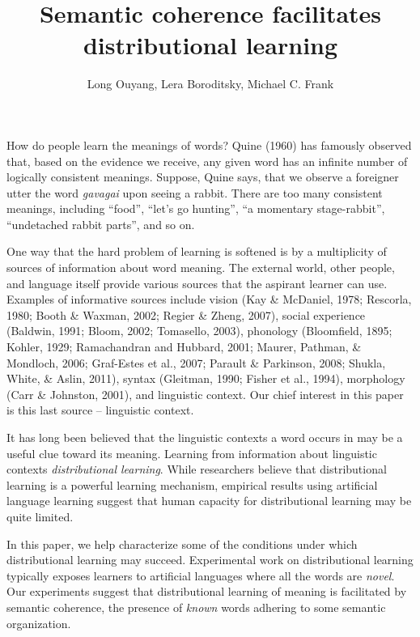 \documentclass[man,floatsintext]{apa6}
\title{Semantic coherence facilitates distributional learning}
\author{Long Ouyang, Lera Boroditsky, Michael C. Frank}
\affiliation{Stanford University}
\begin{document}
\maketitle

How do people learn the meanings of words? Quine (1960) has famously observed that, based on the evidence we receive, any given word has an infinite number of logically consistent meanings. Suppose, Quine says, that we observe a foreigner utter the word \emph{gavagai} upon seeing a rabbit. There are too many consistent meanings, including ``food'', ``let's go hunting'', ``a momentary stage-rabbit'', ``undetached rabbit parts'', and so on.

One way that the hard problem of learning is softened is by a multiplicity of sources of information about word meaning. The external world, other people, and language itself provide various sources that the aspirant learner can use. Examples of informative sources include vision (Kay \& McDaniel, 1978; Rescorla, 1980; Booth \& Waxman, 2002; Regier \& Zheng, 2007), social experience (Baldwin, 1991; Bloom, 2002; Tomasello, 2003), phonology (Bloomfield, 1895; Kohler, 1929; Ramachandran and Hubbard, 2001; Maurer, Pathman, \& Mondloch, 2006; Graf-Estes et al., 2007; Parault \& Parkinson, 2008; Shukla, White, \& Aslin, 2011), syntax (Gleitman, 1990; Fisher et al., 1994), morphology (Carr \& Johnston, 2001), and linguistic context. Our chief interest in this paper is this last source -- linguistic context.

 It has long been believed that the linguistic contexts a word occurs in may be a useful clue toward its meaning. Learning from information about linguistic contexts \emph{distributional learning}. While researchers believe that distributional learning is a powerful learning mechanism, empirical results using artificial language learning suggest that human capacity for distributional learning may be quite limited.
 
In this paper, we help characterize some of the conditions under which distributional learning may succeed. Experimental work on distributional learning typically exposes learners to artificial languages where all the words are \emph{novel}. Our experiments suggest that distributional learning of meaning is facilitated by semantic coherence, the presence of \emph{known} words adhering to some semantic organization.
\end{document}
